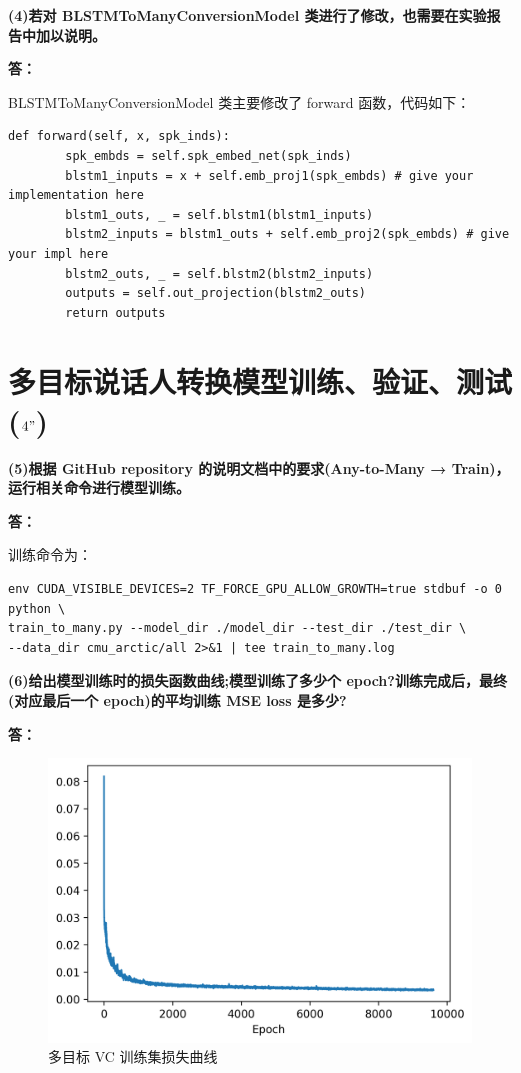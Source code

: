 \documentclass[degree=project,degree-type=project,cjk-font=noto]{thuthesis}
\begin{document}
\textbf{(4)若对 BLSTMToManyConversionModel 类进行了修改，也需要在实验报告中加以说明。}

\textbf{答：}

BLSTMToManyConversionModel 类主要修改了 forward 函数，代码如下：

  \begin{verbatim}
def forward(self, x, spk_inds):
        spk_embds = self.spk_embed_net(spk_inds)
        blstm1_inputs = x + self.emb_proj1(spk_embds) # give your implementation here
        blstm1_outs, _ = self.blstm1(blstm1_inputs)
        blstm2_inputs = blstm1_outs + self.emb_proj2(spk_embds) # give your impl here
        blstm2_outs, _ = self.blstm2(blstm2_inputs)
        outputs = self.out_projection(blstm2_outs)
        return outputs
\end{verbatim}

\section{多目标说话人转换模型训练、验证、测试($4"$)}

\textbf{(5)根据 GitHub repository 的说明文档中的要求(Any-to-Many → Train)，运行相关命令进行模型训练。}

\textbf{答：}

训练命令为：

  \begin{verbatim}
env CUDA_VISIBLE_DEVICES=2 TF_FORCE_GPU_ALLOW_GROWTH=true stdbuf -o 0 python \
train_to_many.py --model_dir ./model_dir --test_dir ./test_dir \
--data_dir cmu_arctic/all 2>&1 | tee train_to_many.log
\end{verbatim}


\textbf{(6)给出模型训练时的损失函数曲线;模型训练了多少个 epoch?训练完成后，最终 (对应最后一个 epoch)的平均训练 MSE loss 是多少?}

\textbf{答：}

\begin{figure}[h]
\centering%
\includegraphics[width=.75\linewidth]{train_task4.png}
  \caption{多目标 VC 训练集损失曲线}
  \label{fig:train_task4}
\end{figure}
\end{document}
